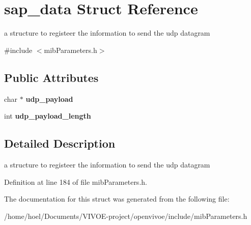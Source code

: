 \hypertarget{structsap__data}{}\section{sap\+\_\+data Struct Reference}
\label{structsap__data}


a structure to registeer the information to send the udp datagram  




{\ttfamily \#include $<$mib\+Parameters.\+h$>$}

\subsection*{Public Attributes}
\begin{DoxyCompactItemize}
\item 
char $\ast$ {\bfseries udp\+\_\+payload}\hypertarget{structsap__data_a3ee70bc15c3e5b07adec0579e0734ff7}{}\label{structsap__data_a3ee70bc15c3e5b07adec0579e0734ff7}

\item 
int {\bfseries udp\+\_\+payload\+\_\+length}\hypertarget{structsap__data_a1b716da4ca0ac386699c9762ff7fb998}{}\label{structsap__data_a1b716da4ca0ac386699c9762ff7fb998}

\end{DoxyCompactItemize}


\subsection{Detailed Description}
a structure to registeer the information to send the udp datagram 

Definition at line 184 of file mib\+Parameters.\+h.



The documentation for this struct was generated from the following file\+:\begin{DoxyCompactItemize}
\item 
/home/hoel/\+Documents/\+V\+I\+V\+O\+E-\/project/openvivoe/include/mib\+Parameters.\+h\end{DoxyCompactItemize}
